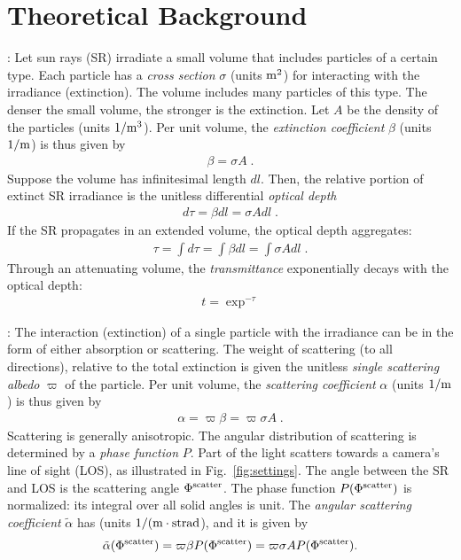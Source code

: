 \documentclass[10pt,twocolumn,letterpaper]{article}
\begin{document}
\section{Theoretical Background}
\label{sec:back}
 \vspace{-0.2cm}

:
Let sun rays (SR) irradiate a small volume that includes particles of a certain type.
Each particle has a {\em cross section} $\sigma$ (units ${\rm m}^2$)
for interacting with the irradiance (extinction).  The volume includes
many particles of this type. The denser the small volume, the stronger is the extinction.
Let $A$ be the density of the particles (units $1/{\rm m}^3$). Per unit volume, the {\em extinction coefficient} $\beta$ (units $1/{\rm m}$)
is thus given by
\begin{align}
  \beta= \sigma A
  \;.
  \label{eq:extinctc}
\end{align}
Suppose the volume has infinitesimal length $dl$. Then, the relative portion of extinct SR irradiance is
the unitless differential {\em optical depth}
\begin{align}
  d\tau= \beta dl=\sigma A dl
  \;.
  \label{eq:extinct}
\end{align}
If the SR propagates in an extended volume, the optical depth aggregates:
\begin{align}
  \tau= \int d\tau=\int \beta dl=\int \sigma A dl
  \;.
  \label{eq:tau}
\end{align}
Through an attenuating volume, the {\em transmittance} exponentially decays with the optical depth:
\begin{align}
  t=\exp^{-\tau}
  \label{eq:beer-lambert}
\end{align}


: The interaction (extinction) of a single particle with the irradiance
can be in the form of either absorption or scattering. The weight of scattering (to all directions), relative to the total extinction is given the unitless {\em single scattering albedo} $\varpi$ of the particle.
Per unit volume, the {\em scattering coefficient} $\alpha$ (units $1/{\rm m}$)
is thus given by
\begin{align}
  \alpha= \varpi\beta=\varpi \sigma A
  \;.
  \label{eq:alph}
\end{align}
Scattering is generally anisotropic. The angular distribution of scattering is determined by
a {\em phase function} $P$. Part of the light scatters towards a camera's line of sight (LOS), as illustrated in
Fig.~\ref{fig:settings}. The angle between the SR and LOS is the scattering angle $\Phi^{\rm scatter}$. The phase function
$P(\Phi^{\rm scatter})$ is normalized: its integral over all solid angles is unit. The {\em angular scattering coefficient}
$\tilde\alpha$ has (units $1/({\rm m}\cdot{{\rm strad}}$), and it is given by
\begin{align}
  \tilde\alpha(\Phi^{\rm scatter}) = \varpi\beta P(\Phi^{\rm scatter}) = \varpi \sigma A P(\Phi^{\rm scatter}).  \label{eq:alphabasic}
\end{align}
\end{document}
